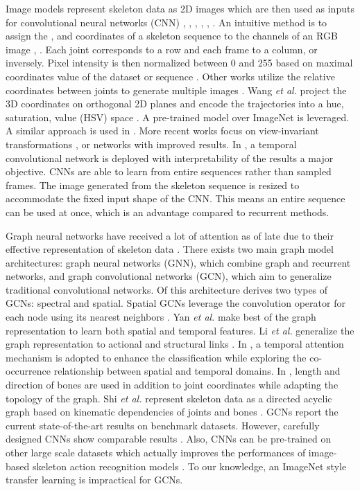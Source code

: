 \documentclass[letterpaper, 10 pt, conference]{ieeeconf}
\begin{document}
Image models represent skeleton data as 2D images which are then used as inputs for convolutional neural networks (CNN) \cite{du2015skeleton}, \cite{ke2017new}, \cite{kim2017interpretable}, \cite{li2017skeleton}, \cite{liu2017enhanced}, \cite{wang2016action}. An intuitive method is to assign the ,  and  coordinates of a skeleton sequence to the channels of an RGB image \cite{du2015skeleton}, \cite{li2017skeleton}. Each joint corresponds to a row and each frame to a column, or inversely. Pixel intensity is then normalized between 0 and 255 based on maximal coordinates value of the dataset \cite{du2015skeleton} or sequence \cite{li2017skeleton}. Other works utilize the relative coordinates between joints to generate multiple images \cite{ke2017new}. Wang \textit{et al.} project the 3D coordinates on orthogonal 2D planes and encode the trajectories into a hue, saturation, value (HSV) space \cite{wang2016action}. A pre-trained model over ImageNet \cite{deng2009imagenet} is leveraged. A similar approach is used in \cite{hou2016skeleton}. More recent works focus on view-invariant transformations \cite{ke2017skeletonnet}, \cite{liu2017enhanced} or networks \cite{zhang2019view} with improved results. In \cite{kim2017interpretable}, a temporal convolutional network is deployed with interpretability of the results a major objective. CNNs are able to learn from entire sequences rather than sampled frames. The image generated from the skeleton sequence is resized to accommodate the fixed input shape of the CNN. This means an entire sequence can be used at once, which is an advantage compared to recurrent methods. 

Graph neural networks have received a lot of attention as of late due to their effective representation of skeleton data \cite{xu2018powerful}. There exists two main graph model architectures: graph neural networks (GNN), which combine graph and recurrent networks, and graph convolutional networks (GCN), which aim to generalize traditional convolutional networks. Of this architecture derives two types of GCNs: spectral and spatial. Spatial GCNs leverage the convolution operator for each node using its nearest neighbors \cite{simonovsky2017dynamic}. Yan \textit{et al.} \cite{yan2018spatial} make best of the graph representation to learn both spatial and temporal features. Li \textit{et al.} generalize the graph representation to actional and structural links \cite{li2019actional}. In \cite{si2019attention}, a temporal attention mechanism is adopted to enhance the classification while exploring the co-occurrence relationship between spatial and temporal domains. In \cite{shi2019two}, length and direction of bones are used in addition to joint coordinates while adapting the topology of the graph. Shi \textit{et al.} represent skeleton data as a directed acyclic graph based on kinematic dependencies of joints and bones \cite{shi2019skeleton}. GCNs report the current state-of-the-art results on benchmark datasets. However, carefully designed CNNs show comparable results \cite{zhang2019view}. Also, CNNs can be pre-trained on other large scale datasets which actually improves the performances of image-based skeleton action recognition models \cite{zhang2019view}. To our knowledge, an ImageNet \cite{deng2009imagenet} style transfer learning is impractical for GCNs.  
\end{document}
